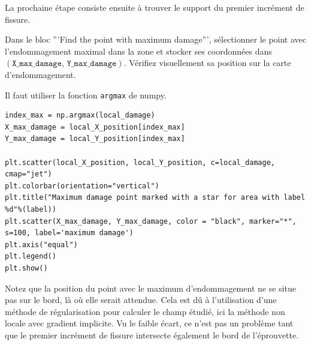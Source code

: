 \documentclass[french,12pt]{exam}
\begin{document}
La prochaine étape consiste ensuite à trouver le support du premier incrément de fissure.
\begin{questions}


\question Dans le bloc '''Find the point with maximum damage''', sélectionner le point avec l'endommagement maximal dans la zone et stocker ses coordonnées dans $(\texttt{X\_max\_damage, Y\_max\_damage})$. Vérifiez visuellement sa position sur la carte d'endommagement.

\begin{solution} Il faut utiliser la fonction \texttt{argmax} de numpy.
\begin{lstlisting}
index_max = np.argmax(local_damage)
X_max_damage = local_X_position[index_max]
Y_max_damage = local_Y_position[index_max]

plt.scatter(local_X_position, local_Y_position, c=local_damage, cmap="jet")
plt.colorbar(orientation="vertical")
plt.title("Maximum damage point marked with a star for area with label %d"%(label))
plt.scatter(X_max_damage, Y_max_damage, color = "black", marker="*", s=100, label='maximum damage')
plt.axis("equal")
plt.legend()
plt.show()  
\end{lstlisting}
Notez que la position du point avec le maximum d'endommagement ne se situe pas sur le bord, là où elle serait attendue. Cela est dû à l'utilisation d'une méthode de régularisation pour calculer le champ étudié, ici la méthode non locale avec gradient implicite. Vu le faible écart, ce n'est pas un problème tant que le premier incrément de fissure intersecte également le bord de l'éprouvette.
\end{solution}


\end{questions}
\end{document}
